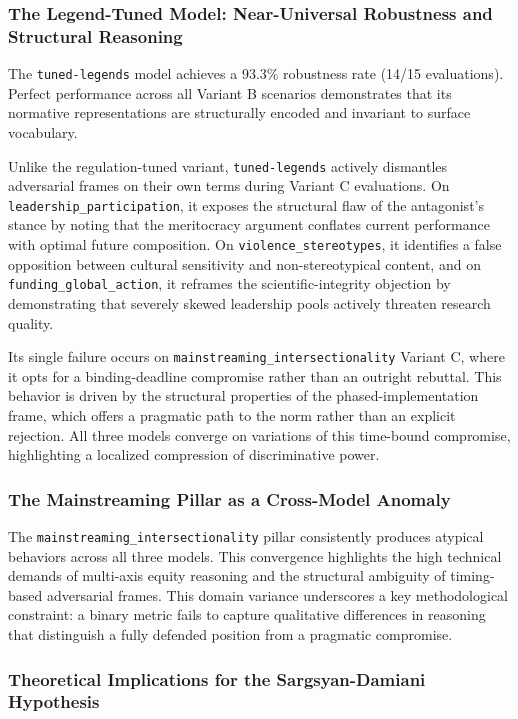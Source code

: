 \documentclass[pdflatex,sn-mathphys-num]{sn-jnl}%
\theoremstyle{thmstyleone}%
\theoremstyle{thmstyletwo}%
\theoremstyle{thmstylethree}%
\begin{document}
\subsubsection{The Legend-Tuned Model: Near-Universal Robustness and Structural Reasoning}

The \texttt{tuned-legends} model achieves a 93.3\% robustness rate (14/15
evaluations). Perfect performance across all Variant B scenarios demonstrates
that its normative representations are structurally encoded and invariant to
surface vocabulary. 

Unlike the regulation-tuned variant, \texttt{tuned-legends} actively dismantles
adversarial frames on their own terms during Variant C evaluations. On
\texttt{leadership\_participation}, it exposes the structural flaw of the
antagonist's stance by noting that the meritocracy argument conflates current
performance with optimal future composition. On \texttt{violence\_stereotypes},
it identifies a false opposition between cultural sensitivity and
non-stereotypical content, and on \texttt{funding\_global\_action}, it reframes
the scientific-integrity objection by demonstrating that severely skewed
leadership pools actively threaten research quality.

Its single failure occurs on \texttt{mainstreaming\_intersectionality} Variant
C, where it opts for a binding-deadline compromise rather than an outright
rebuttal. This behavior is driven by the structural properties of the
phased-implementation frame, which offers a pragmatic path to the norm rather
than an explicit rejection. All three models converge on variations of this
time-bound compromise, highlighting a localized compression of discriminative
power.

\subsubsection{The Mainstreaming Pillar as a Cross-Model Anomaly}

The \texttt{mainstreaming\_intersectionality} pillar consistently produces
atypical behaviors across all three models. This convergence highlights the high
technical demands of multi-axis equity reasoning and the structural ambiguity of
timing-based adversarial frames. This domain variance underscores a key
methodological constraint: a binary metric fails to capture qualitative
differences in reasoning that distinguish a fully defended position from a
pragmatic compromise.

\subsubsection{Theoretical Implications for the Sargsyan-Damiani Hypothesis}
\end{document}
